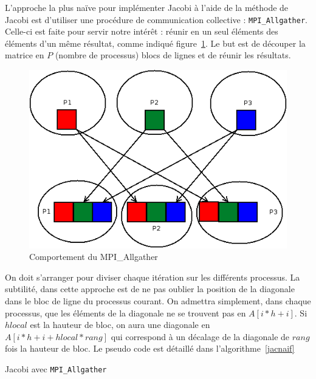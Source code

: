 \documentclass[a4paper]{article}
\begin{document}
L'approche la plus naïve pour implémenter Jacobi à l'aide de la
méthode de Jacobi est d'utiliser une procédure de communication
collective : \texttt{MPI\_Allgather}. Celle-ci est faite pour
servir notre intérêt : réunir en un seul éléments des éléments d'un
même résultat, comme indiqué figure~\ref{allgather}. Le but est de
découper la matrice en $P$ (nombre de processus) blocs de lignes et de
réunir les résultats.


\begin{figure}
\centering
\includegraphics[scale=0.4]{allgather.png}
\caption{\label{allgather}Comportement du MPI\_Allgather}
\end{figure}

On doit s'arranger pour diviser chaque itération sur les différents
processus. La subtilité, dans cette approche est de ne pas oublier la
position de la diagonale dans le bloc de ligne du processus courant.
On admettra simplement, dans chaque processus, que les éléments de la
diagonale ne se trouvent pas en $A[i * h + i] $. Si $hlocal$ est la
hauteur de bloc, on aura une diagonale en $A[i * h + i + hlocal *
rang]$ qui correspond à un décalage de la diagonale de $rang$ fois la
hauteur de bloc.
Le pseudo code est détaillé dans l'algorithme~\ref{jacnaif}

\begin{algorithm}[H]
 \SetLine %
 
 \caption{\label{jacnaif}Jacobi avec \texttt{MPI\_Allgather}}
\end{algorithm}
\end{document}
